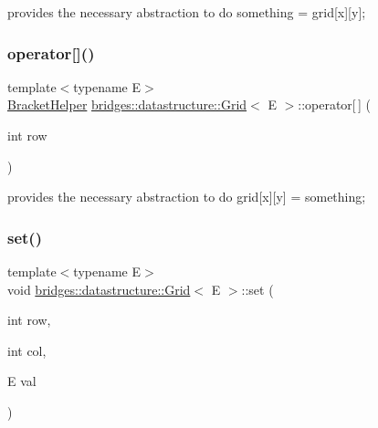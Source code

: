 provides the necessary abstraction to do something = grid\mbox{[}x\mbox{]}\mbox{[}y\mbox{]}; 

\mbox{\label{classbridges_1_1datastructure_1_1_grid_ae5a7cf159c7918193ba75146660c3c1f}} 
\subsubsection{\texorpdfstring{operator[]()}{operator[]()}\hspace{0.1cm}{\footnotesize\ttfamily [2/2]}}
{\footnotesize\ttfamily template$<$typename E$>$ \\
\hyperlink{classbridges_1_1datastructure_1_1_grid_1_1_bracket_helper}{Bracket\+Helper} \hyperlink{classbridges_1_1datastructure_1_1_grid}{bridges\+::datastructure\+::\+Grid}$<$ E $>$\+::operator\mbox{[}$\,$\mbox{]} (\begin{DoxyParamCaption}\item[{int}]{row }\end{DoxyParamCaption})\hspace{0.3cm}{\ttfamily [inline]}}



provides the necessary abstraction to do grid\mbox{[}x\mbox{]}\mbox{[}y\mbox{]} = something; 

\mbox{\label{classbridges_1_1datastructure_1_1_grid_ac0d4784a31f69d8cf4be38952730cfa8}} 
\subsubsection{\texorpdfstring{set()}{set()}}
{\footnotesize\ttfamily template$<$typename E$>$ \\
void \hyperlink{classbridges_1_1datastructure_1_1_grid}{bridges\+::datastructure\+::\+Grid}$<$ E $>$\+::set (\begin{DoxyParamCaption}\item[{int}]{row,  }\item[{int}]{col,  }\item[{E}]{val }\end{DoxyParamCaption})\hspace{0.3cm}{\ttfamily [inline]}}

